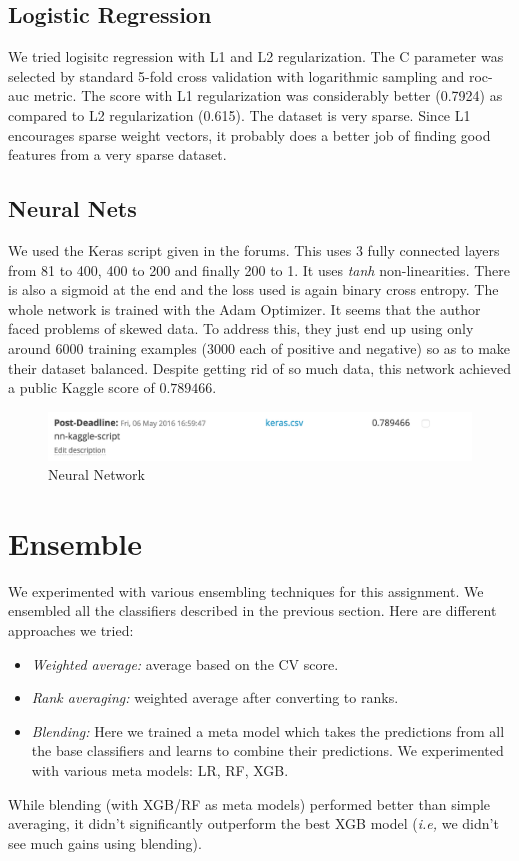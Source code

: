 \documentclass{article}
\begin{document}
\subsection{Logistic Regression}
We tried logisitc regression with L1 and L2 regularization. The C parameter was selected by standard 5-fold cross validation with logarithmic sampling and roc-auc metric. The score with L1 regularization was considerably better (0.7924) as compared to L2 regularization (0.615). The dataset is very sparse. Since L1 encourages sparse weight vectors, it probably does a better job of finding good features from a very sparse dataset.

\subsection{Neural Nets}
We used the Keras script given in the forums. This uses 3 fully connected layers from 81 to 400, 400 to 200 and finally 200 to 1. It uses \emph{tanh} non-linearities. There is also a sigmoid at the end and the loss used is again binary cross entropy.  The whole network is trained with the Adam Optimizer. It seems that the author faced problems of skewed data. To address this, they just end up using only around 6000 training examples (3000 each of positive and negative) so as to make their dataset balanced. Despite getting rid of so much data, this network achieved a public Kaggle score of $0.789466$.
\begin{figure}[tbh]
\includegraphics[scale = 0.7]{nn2}
\caption{Neural Network}
\end{figure}
\section{Ensemble}
We experimented with various ensembling techniques for this assignment. We ensembled all the classifiers described in the previous section. Here are different approaches we tried:
\begin{itemize}
\item \textit{Weighted average:} average based on the CV score.
\item \textit{Rank averaging:} weighted average after converting to ranks.
\item \textit{Blending:} Here we trained a meta model which takes the predictions from all the base classifiers and learns to combine their predictions. We experimented with various meta models: LR, RF, XGB.
\end{itemize}
While blending (with XGB/RF as meta models) performed better than simple averaging, it didn't significantly outperform the best XGB model (\textit{i.e,} we didn't see much gains using blending). 
\end{document}
